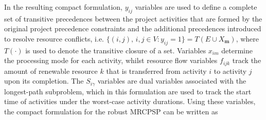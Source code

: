\documentclass[a4paper,abstracton]{scrartcl}
\begin{document}
In the resulting compact formulation, $y_{ij}$ variables are used to define a complete set of transitive precedences between the project activities that are formed by the original project precedence constraints and the additional precedences introduced to resolve resource conflicts, i.e. $\{(i,j),\, i,j\in V:y_{ij}=1\}=T(E\cup X_{\bm{m}})$, where $T(\cdot)$ is used to denote the transitive closure of a set. Variables $x_{im}$ determine the processing mode for each activity, whilst resource flow variables $f_{ijk}$ track the amount of renewable resource $k$ that is transferred from activity $i$ to activity $j$ upon its completion. The $S_{i\gamma}$ variables are dual variables associated with the longest-path subproblem, which in this formulation are used to track the start time of activities under the worst-case activity durations. Using these variables, the compact formulation for the robust MRCPSP can be written as   
\end{document}
